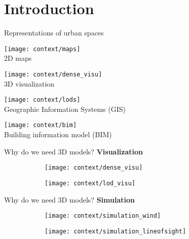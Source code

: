 \section{Introduction}

\begin{frame}{Representations of urban spaces}
	\centering
	\scriptsize
	\pause
	\begin{minipage}{0.5\linewidth}
		\centering
		\texttt{[image: context/maps]}\\
		2D maps
	\end{minipage}%
	\pause%
	\begin{minipage}{0.5\linewidth}
		\centering
		\texttt{[image: context/dense\_visu]}\\
		3D visualization
	\end{minipage}%
	\pause
	
	\begin{minipage}{0.5\linewidth}
		\centering
		\texttt{[image: context/lods]}\\
		Geographic Information Systems (GIS)
	\end{minipage}%
	\pause%
	\begin{minipage}{0.5\linewidth}
		\centering
		\texttt{[image: context/bim]}\\
		Building information model (BIM)
	\end{minipage}
\end{frame}

\begin{frame}[t]{Why do we need 3D models?}
	\textbf{Visualization}
	\vfill
	\begin{figure}
		\centering
		\begin{subfigure}[t]{0.45\linewidth}
			\texttt{[image: context/dense\_visu]}
		\end{subfigure}
		\hfill%
		\begin{subfigure}[t]{0.45\linewidth}
			\texttt{[image: context/lod\_visu]}
		\end{subfigure}
	\end{figure}
\end{frame}

\begin{frame}[t]{Why do we need 3D models?}
	\textbf{Simulation}
	\vfill
	\begin{figure}
		\centering
		\begin{subfigure}[t]{0.45\linewidth}
			\texttt{[image: context/simulation\_wind]}
		\end{subfigure}
		\hfill%
		\begin{subfigure}[t]{0.45\linewidth}
			\texttt{[image: context/simulation\_lineofsight]}
		\end{subfigure}
	\end{figure}
\end{frame}

